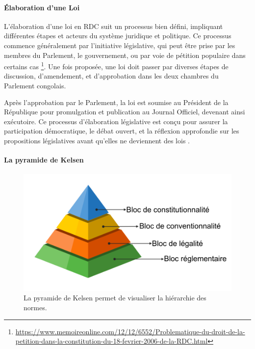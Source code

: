 \paragraph{Élaboration d'une Loi} \hspace{0pt}

L'élaboration d'une loi en RDC suit un processus bien défini, impliquant différentes étapes et acteurs du système juridique et politique. Ce processus commence généralement par l'initiative législative, qui peut être prise par les membres du Parlement, le gouvernement, ou par voie de pétition populaire dans certains cas \footnote{\href{https://www.memoireonline.com/12/12/6552/Problematique-du-droit-de-la-petition-dans-la-constitution-du-18-fevrier-2006-de-la-RDC.html}{https://www.memoireonline.com/12/12/6552/Problematique-du-droit-de-la-petition-dans-la-constitution-du-18-fevrier-2006-de-la-RDC.html}}. Une fois proposée, une loi doit passer par diverses étapes de discussion, d'amendement, et d'approbation dans les deux chambres du Parlement congolais.

Après l'approbation par le Parlement, la loi est soumise au Président de la République pour promulgation et publication au Journal Officiel, devenant ainsi exécutoire. Ce processus d'élaboration législative est conçu pour assurer la participation démocratique, le débat ouvert, et la réflexion approfondie sur les propositions législatives avant qu'elles ne deviennent des lois \cite{joel_22AD, joel_23AD}.

\paragraph{La pyramide de Kelsen \cite{Kelsen_Raphael_2024, Kelsen_jurixio_2023}} \hspace{0pt}

\begin{figure}[H]
    \centering
    \includegraphics[width=12cm]{gfx/fig-law-pyramide.png}
    \caption{La pyramide de Kelsen permet de visualiser la hiérarchie des normes. \cite{frwiki:212163472}}
    \label{fig:datagenerated}
\end{figure}

